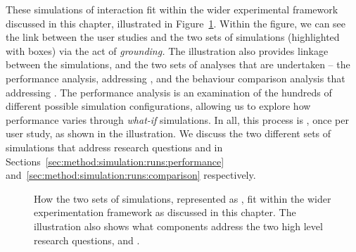 These simulations of interaction fit within the wider experimental framework discussed in this chapter, illustrated in Figure~\ref{fig:sim_evaluation}. Within the figure, we can see the link between the user studies and the two sets of simulations (highlighted with  boxes) via the act of \emph{grounding.} The illustration also provides linkage between the simulations, and the two sets of analyses that are undertaken -- the performance analysis, addressing , and the behaviour comparison analysis that addressing . The performance analysis is an examination of the hundreds of different possible simulation configurations, allowing us to explore how performance varies through \emph{what-if} simulations. In all, this process is , once per user study, as shown in the illustration. We discuss the two different sets of simulations that address research questions  and  in Sections~\ref{sec:method:simulation:runs:performance} and~\ref{sec:method:simulation:runs:comparison} respectively.

\begin{figure}[t!]
    \centering
    \caption[Empirical evaluation framework]{How the two sets of simulations, represented as , fit within the wider experimentation framework as discussed in this chapter. The illustration also shows what components address the two high level research questions,  and .}
    \label{fig:sim_evaluation}
\end{figure}

